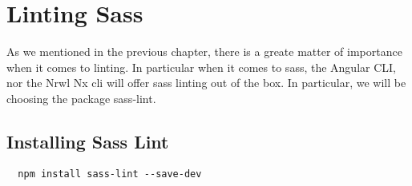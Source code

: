 \maketitle{}
\section{ Linting Sass }

As we mentioned in the previous chapter, there is a greate matter of importance
when it comes to linting. In particular when it comes to sass, the Angular CLI,
nor the Nrwl Nx cli will offer sass linting out of the box. In particular,
we will be choosing the package sass-lint.

\subsection{Installing Sass Lint}
\begin{verbatim}
  npm install sass-lint --save-dev
\end{verbatim}
